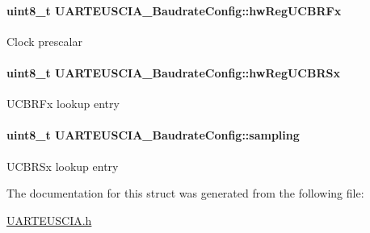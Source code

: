 \paragraph[{hw\+Reg\+U\+C\+B\+R\+Fx}]{\setlength{\rightskip}{0pt plus 5cm}uint8\+\_\+t U\+A\+R\+T\+E\+U\+S\+C\+I\+A\+\_\+\+Baudrate\+Config\+::hw\+Reg\+U\+C\+B\+R\+Fx}\label{struct_u_a_r_t_e_u_s_c_i_a___baudrate_config_a486441ac0287eee5d2f1cec429ca7a84}
Clock prescalar 
\paragraph[{hw\+Reg\+U\+C\+B\+R\+Sx}]{\setlength{\rightskip}{0pt plus 5cm}uint8\+\_\+t U\+A\+R\+T\+E\+U\+S\+C\+I\+A\+\_\+\+Baudrate\+Config\+::hw\+Reg\+U\+C\+B\+R\+Sx}\label{struct_u_a_r_t_e_u_s_c_i_a___baudrate_config_a644a24cfb8503deef280eb7142e98cbf}
U\+C\+B\+R\+Fx lookup entry 
\paragraph[{sampling}]{\setlength{\rightskip}{0pt plus 5cm}uint8\+\_\+t U\+A\+R\+T\+E\+U\+S\+C\+I\+A\+\_\+\+Baudrate\+Config\+::sampling}\label{struct_u_a_r_t_e_u_s_c_i_a___baudrate_config_a9c18d479e91a0b5258fcd1821c09cf2e}
U\+C\+B\+R\+Sx lookup entry 

The documentation for this struct was generated from the following file\+:\begin{DoxyCompactItemize}
\item 
\hyperlink{_u_a_r_t_e_u_s_c_i_a_8h}{U\+A\+R\+T\+E\+U\+S\+C\+I\+A.\+h}\end{DoxyCompactItemize}
